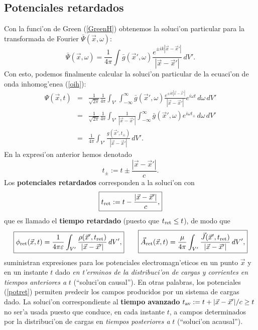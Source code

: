 \subsection{Potenciales retardados}
Con la funci'on de Green (\ref{GreenH}) obtenemos la soluci'on particular para la
transformada de Fourier $\bar{\Psi}(\vec{x},\omega)$:
\begin{equation}
\bar{\Psi}(\vec{x},\omega)=\frac{1}{4\pi}\int
\bar{g}(\vec{x}',\omega)\frac{e^{\pm
ik|\vec{x}-\vec{x}'|}}{|\vec{x}-\vec{x}'|}\,dV' .
\end{equation}
Con esto, podemos finalmente calcular la soluci'on particular de la ecuaci'on de
onda inhomog'enea (\ref{oih}):
\begin{eqnarray}
\Psi(\vec{x},t)&=&\frac{1}{\sqrt{2\pi}}\frac{1}{4\pi}\int_{V'}\int_{-\infty}
^\infty \bar{g}(\vec{x}',\omega)\frac{e^{\pm
ik|\vec{x}-\vec{x}'|}}{|\vec{x}-\vec{x}'|}e^{i\omega t}\,d\omega\,dV'  \\
&=&\frac{1}{\sqrt{2\pi}}\frac{1}{4\pi}\int_{V'}\frac{1}{|\vec{x}-\vec{x}'|}\int_
{-\infty}^\infty \bar{g}(\vec{x}',\omega)e^{i\omega t_{\pm}}\,d\omega \,dV' \\
&=&\frac{1}{4\pi}\int_{V'} \frac{g(\vec{x}',t_{\pm})}{|\vec{x}-\vec{x}'|}\,dV' .
\end{eqnarray}
En la expresi'on anterior hemos denotado
\begin{equation}
t_{\pm}:=t\pm \frac{|\vec{x}-\vec{x}'|}{c}.
\end{equation}
Los \textbf{potenciales retardados} corresponden a la soluci'on con
\begin{equation}
\boxed{t_{\rm ret}:=t-\frac{|\vec{x}-\vec{x}'|}{c},} \label{deftret}
\end{equation}
que es llamado el \textbf{tiempo retardado} (puesto que $t_{\rm ret}\le t$), de modo que
\begin{equation}
\boxed{\phi_{\rm ret}(\vec{x},t)=\frac{1}{4\pi\varepsilon}\int_{V'}
\frac{\rho(\vec{x}',t_{\rm ret})}{|\vec{x}-\vec{x}'|}\,dV',} \qquad \boxed{\vec{A}_{\rm
ret}(\vec{x},t)=\frac{\mu}{4\pi}\int_{V'}
\frac{\vec{J}(\vec{x}',t_{\rm ret})}{|\vec{x}-\vec{x}'|}\,dV' ,} \label{potret}
\end{equation}
suministran expresiones para los potenciales electromagn'eticos en un punto
$\vec{x}$ y en un instante $t$ dado \textit{en t'erminos de la distribuci'on de cargas y corrientes en tiempos anteriores a} $t$ (``soluci'on causal''). En otras palabras, los potenciales (\ref{potret}) permiten \textit{pre}decir los campos producidos por un sistema de cargas dado. La soluci'on correspondiente al \textbf{tiempo avanzado} $t_{\rm av}:=t+{|\vec{x}-\vec{x}'|}/{c}\ge t$ no ser'a usada puesto que conduce, en cada instante $t$, a campos determinados por la distribuci'on de cargas en \textit{tiempos posteriores a }$t$ (``soluci'on acausal'').

